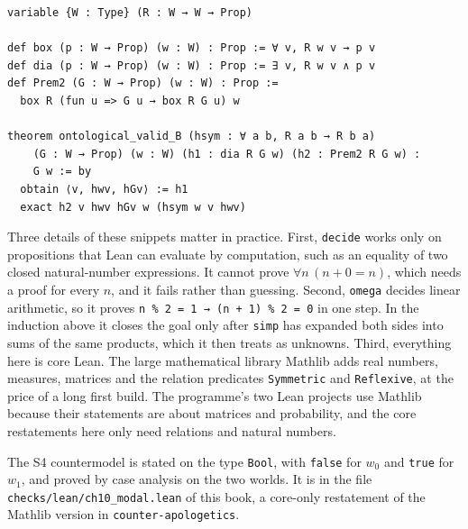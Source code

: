 \begin{verbatim}
variable {W : Type} (R : W → W → Prop)

def box (p : W → Prop) (w : W) : Prop := ∀ v, R w v → p v
def dia (p : W → Prop) (w : W) : Prop := ∃ v, R w v ∧ p v
def Prem2 (G : W → Prop) (w : W) : Prop :=
  box R (fun u => G u → box R G u) w

theorem ontological_valid_B (hsym : ∀ a b, R a b → R b a)
    (G : W → Prop) (w : W) (h1 : dia R G w) (h2 : Prem2 R G w) :
    G w := by
  obtain ⟨v, hwv, hGv⟩ := h1
  exact h2 v hwv hGv w (hsym w v hwv)
\end{verbatim}
Three details of these snippets matter in practice. First, \texttt{decide} works only on propositions that Lean can evaluate by computation, such as an equality of two closed natural-number expressions. It cannot prove $\forall n\,(n+0=n)$, which needs a proof for every $n$, and it fails rather than guessing. Second, \texttt{omega} decides linear arithmetic, so it proves \texttt{n \% 2 = 1 → (n + 1) \% 2 = 0} in one step. In the induction above it closes the goal only after \texttt{simp} has expanded both sides into sums of the same products, which it then treats as unknowns. Third, everything here is core Lean. The large mathematical library Mathlib adds real numbers, measures, matrices and the relation predicates \texttt{Symmetric} and \texttt{Reflexive}, at the price of a long first build. The programme's two Lean projects use Mathlib because their statements are about matrices and probability, and the core restatements here only need relations and natural numbers.

The S4 countermodel is stated on the type \texttt{Bool}, with \texttt{false} for $w_0$ and \texttt{true} for $w_1$, and proved by case analysis on the two worlds. It is in the file \texttt{checks/lean/ch10\_modal.lean} of this book, a core-only restatement of the Mathlib version in \texttt{counter-apologetics}.



